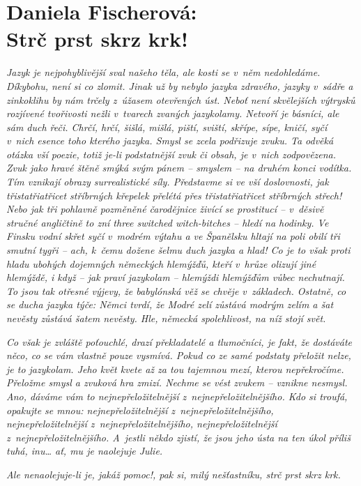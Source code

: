 \section{Daniela Fischerová: \\ Strč prst skrz krk!}

\noindent
\textit{Jazyk je nejpohyblivější sval našeho těla, ale kosti se v něm nedohledáme. Díkybohu, není si co zlomit.  Jinak už by nebylo jazyka zdravého, jazyky v sádře a zinkoklihu by nám trčely z úžasem otevřených úst. Neboť není skvělejších výtrysků rozjívené tvořivosti nežli v tvarech zvaných jazykolamy. Netvoří je básníci, ale sám duch řeči. Chrčí, hrčí, šišlá, mišlá, piští, sviští, skřípe, sípe, kničí, syčí v nich esence toho kterého jazyka. Smysl se zcela podřizuje zvuku.  Ta odvěká otázka vší poezie, totiž je-li podstatnější zvuk či obsah, je v nich zodpovězena. Zvuk jako hravé štěně smýká svým pánem -- smyslem -- na druhém konci vodítka. Tím vznikají obrazy surrealistické síly. Představme si ve vší doslovnosti, jak třistatřiatřicet stříbrných křepelek přelétá přes třistatřiatřicet stříbrných střech! Nebo jak tři pohlavně pozměněné čarodějnice živící se prostitucí -- v děsivě stručné angličtině to zní three switched witch-bitches -- hledí na hodinky. Ve Finsku vodní skřet syčí v modrém výtahu a ve Španělsku hltají na poli obilí tři smutní tygři -- ach, k čemu dožene šelmu duch jazyka a hlad! Co je to však proti hladu ubohých dojemných německých hlemýžďů, kteří v~hrůze olizují jiné hlemýždě, i když -- jak praví jazykolam --  hlemýždi hlemýžďům vůbec nechutnají. To jsou tak otřesné výjevy, že babylónská věž se chvěje v základech. Ostatně, co se ducha jazyka týče: Němci tvrdí, že Modré zelí zůstává modrým zelím a  šat nevěsty zůstává šatem nevěsty. Hle, německá spolehlivost, na níž stojí svět.}

\textit{Co však je zvláště poťouchlé, drazí překladatelé a tlumočníci, je fakt, že dostáváte něco, co se vám vlastně pouze vysmívá. Pokud co ze samé podstaty přeložit nelze, je to jazykolam. Jeho květ kvete až za tou tajemnou mezí, kterou nepřekročíme. Přeložme smysl a zvuková hra zmizí. Nechme se vést zvukem -- vznikne nesmysl. Ano, dáváme vám to nejnepřeložitelnější z nejnepřeložitelnějšího. Kdo si troufá, opakujte se mnou: nejnepřeložitelnější z nejnepřeložitelnějšího, nejnepřeložitelnější z nejnepřeložitelnějšího, nejnepřeložitelnější z nejnepřeložitelnějšího. A~jestli někdo zjistí, že jsou jeho ústa na ten úkol příliš tuhá, inu… ať, mu je naolejuje Julie.}

\textit{Ale nenaolejuje-li je, jakáž pomoc!, pak si, milý nešťastníku, strč prst skrz krk.}

